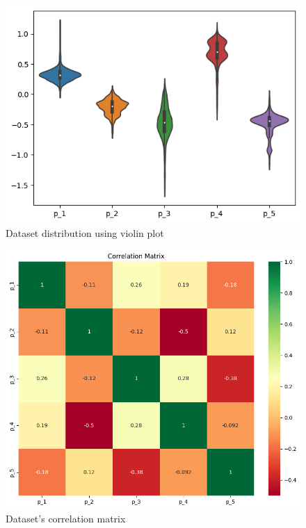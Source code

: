 \documentclass[a4paper, fleqn]{cas-sc}
\begin{document}
\begin{figure}[h!]
  \centering
   \includegraphics[scale=.5]{violin_plot_5_patients.png}
  \caption{Dataset distribution using violin plot}
   \label{Fig:2}
\end{figure}

 
   \begin{figure}[h!]
    \centering
     \includegraphics[scale=.42]{correlation_matrix_5_patients.png}
     \caption{Dataset's correlation matrix} 
     \label{Fig:3}
    \end{figure} 
\end{document}
